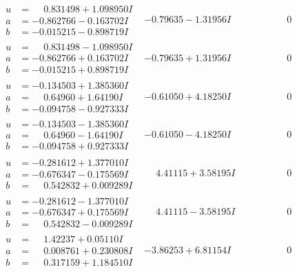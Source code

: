 \documentclass[1p]{elsarticle_modified}
\theoremstyle{definition}
\begin{document}
$$\begin{array}{c|c|c}
\begin{aligned}
u &= \phantom{-}0.831498 + 1.098950 I \\
a &= -0.862766 - 0.163702 I \\
b &= -0.015215 - 0.898719 I\end{aligned}
 & -0.79635 - 1.31956 I & \phantom{-0.000000 } 0 \\ \hline\begin{aligned}
u &= \phantom{-}0.831498 - 1.098950 I \\
a &= -0.862766 + 0.163702 I \\
b &= -0.015215 + 0.898719 I\end{aligned}
 & -0.79635 + 1.31956 I & \phantom{-0.000000 } 0 \\ \hline\begin{aligned}
u &= -0.134503 + 1.385360 I \\
a &= \phantom{-}0.64960 + 1.64190 I \\
b &= -0.094758 - 0.927333 I\end{aligned}
 & -0.61050 + 4.18250 I & \phantom{-0.000000 } 0 \\ \hline\begin{aligned}
u &= -0.134503 - 1.385360 I \\
a &= \phantom{-}0.64960 - 1.64190 I \\
b &= -0.094758 + 0.927333 I\end{aligned}
 & -0.61050 - 4.18250 I & \phantom{-0.000000 } 0 \\ \hline\begin{aligned}
u &= -0.281612 + 1.377010 I \\
a &= -0.676347 - 0.175569 I \\
b &= \phantom{-}0.542832 + 0.009289 I\end{aligned}
 & \phantom{-}4.41115 + 3.58195 I & \phantom{-0.000000 } 0 \\ \hline\begin{aligned}
u &= -0.281612 - 1.377010 I \\
a &= -0.676347 + 0.175569 I \\
b &= \phantom{-}0.542832 - 0.009289 I\end{aligned}
 & \phantom{-}4.41115 - 3.58195 I & \phantom{-0.000000 } 0 \\ \hline\begin{aligned}
u &= \phantom{-}1.42237 + 0.05110 I \\
a &= \phantom{-}0.008761 + 0.230808 I \\
b &= \phantom{-}0.317159 + 1.184510 I\end{aligned}
 & -3.86253 + 6.81154 I & \phantom{-0.000000 } 0 \\ \hline\begin{aligned}

\end{aligned}
\end{array}$$
\end{document}
